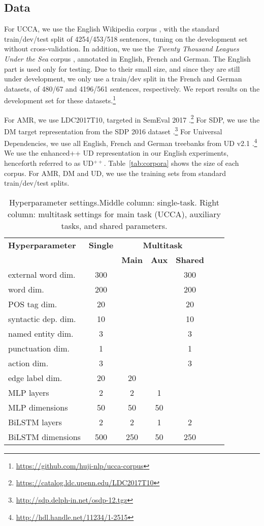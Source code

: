 \documentclass[11pt,a4paper]{article}
\begin{document}
\subsection{Data}\label{sec:data}

For UCCA, we use the English Wikipedia corpus \cite{abend2013universal},
with the standard train/dev/test split of 4254/453/518 sentences,
tuning on the development set without cross-validation.
In addition, we use
the \textit{Twenty Thousand Leagues Under the Sea} corpus \cite[20K leagues;][]{sulem2015conceptual},
annotated in English, French and German.
The English part is used only for testing.
Due to their small size, and since they are still under development, we only use a train/dev split
in the French and German datasets, of 480/67 and 4196/561 sentences, respectively.
We report results on the development set for these
datasets.\footnote{\url{https://github.com/huji-nlp/ucca-corpus}}

For AMR, we use LDC2017T10, targeted in SemEval 2017
\cite{may2017semeval}.\footnote{\url{https://catalog.ldc.upenn.edu/LDC2017T10}}
For SDP, we use the DM target representation from the SDP 2016 dataset
\cite{oepen2016towards}.\footnote{\url{http://sdp.delph-in.net/osdp-12.tgz}}
For Universal Dependencies, we use all English, French and German treebanks from UD v2.1
\cite{11234/1-2515}.\footnote{\url{http://hdl.handle.net/11234/1-2515}}
We use the enhanced++ UD representation \cite{SCHUSTER16.779} in our English experiments,
henceforth referred to as UD$^{++}$.
Table~\ref{tab:corpora} shows the size of each corpus.
For AMR, DM and UD, we use the training sets from standard train/dev/test splits.

\begin{table}
\centering
\footnotesize
\begin{tabular}{l|c|ccccc}
\bf Hyperparameter &  \bf Single & \multicolumn{3}{c}{\bf Multitask} \\ 
&& \bf Main & \bf Aux & \bf Shared \\
\hline
external word dim. & 300 &&& 300 \\
word dim. & 200 &&& 200 \\
POS tag dim. & 20 &&& 20 \\
syntactic dep. dim. & 10 &&& 10 \\
named entity dim. & 3 &&& 3 \\
punctuation dim. & 1 &&& 1 \\
action dim. & 3 &&& 3 \\
edge label dim. & 20 & 20 \\
MLP layers & 2 & 2 & 1 \\
MLP dimensions & 50 & 50 & 50 \\
BiLSTM layers & 2 & 2 & 1 & 2 \\
BiLSTM dimensions & 500 & 250 & 50 & 250
\end{tabular}
\caption{Hyperparameter settings.\label{tab:hyperparams}
Middle column: single-task.
Right column: multitask settings for main task (UCCA), auxiliary tasks, and shared parameters.}
\end{table}
\end{document}
